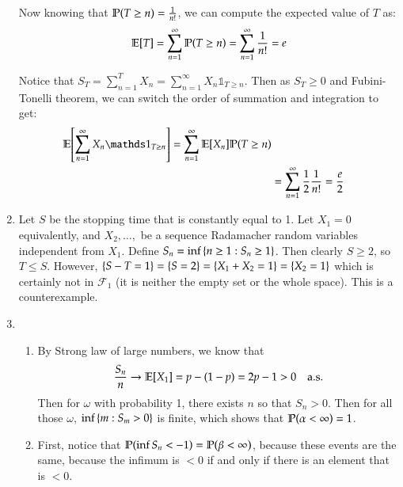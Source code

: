 \documentclass[12pt]{article}
\theoremstyle{definitionstyle}
\newcommand{\SET}[1]{\Set{\mskip-\medmuskip #1 \mskip-\medmuskip}}
\newcommand{\1}{\mathds 1}
\renewcommand{\P}{\mathbb P \qty}
\newcommand{\E}{\mathbb E \qty}
\begin{document}
\begin{enumerate}
        Now knowing that $\P(T \geq n) = \frac{1}{n!}$, we can compute the expected value of $T$ as:
        \begin{align*}
            \E[T] = \sum_{n=1}^\infty \P(T \geq n) = \sum_{n=1}^\infty \frac{1}{n!} = e
        \end{align*}

        Notice that $S_T = \sum_{n=1}^T X_n = \sum_{n=1}^\infty X_n \1_{T \geq n}$. Then as $S_T \geq 0$ and Fubini-Tonelli theorem, we can switch the order of summation and integration to get:
        \begin{align*}
            \E[\sum_{n=1}^\infty X_n \1_{T \geq n}] = \sum_{n=1}^\infty \E[X_n] \P(T \geq n) \\
            &= \sum_{n=1}^\infty \frac 12 \frac{1}{n!} = \frac{e}{2}
        \end{align*}

        \item Let $S$ be the stopping time that is constantly equal to 1. Let $X_1 = 0$ equivalently, and $X_2, \ldots,$ be a sequence Radamacher random variables independent from $X_1$. Define $S_n = \inf \SET{n \geq 1 : S_n \geq 1}$. Then clearly $S \geq 2$, so $T \leq S$. However, $\SET{S - T = 1} = \SET{S = 2} = \SET{X_1+X_2 = 1} = \SET{X_2 = 1}$ which is certainly not in $\mathscr{F}_1$ (it is neither the empty set or the whole space). This is a counterexample. 

        \item \begin{enumerate}[label=(\alph*)]
            \item By Strong law of large numbers, we know that 
            \begin{align*}
                \frac{S_n}{n} \to \E[X_1] = p - (1-p) = 2p-1 > 0 \quad \text{a.s.}
            \end{align*}
            Then for $\omega$ with probability 1, there exists $n$ so that $S_n > 0$. Then for all those $\omega$, $\inf \SET{m : S_m > 0}$ is finite, which shows that $\P(\alpha < \infty) = 1$.
            \item First, notice that $\P(\inf S_n < -1) = \P(\beta < \infty)$, because these events are the same, because the infimum is $< 0$ if and only if there is an element that is $< 0$. 


\end{enumerate}
\end{enumerate}
\end{document}
